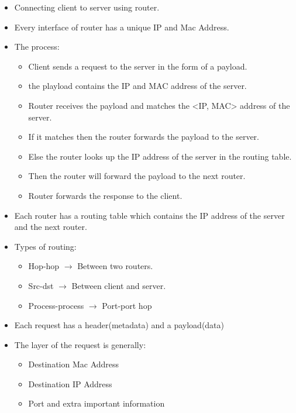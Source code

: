 \documentclass[a4paper, twoside]{report}
\author{Dev M.}
\date{07/08/2023}
\begin{document}


\begin{itemize}
    \item Connecting client to server using router.
    \item Every interface of router has a unique IP and Mac Address.
    \item The process: 
        \begin{itemize}
            \item Client sends a request to the server in the form of a payload.
            \item the playload contains the IP and MAC address of the server. 
            \item Router receives the payload and matches the <IP, MAC> address of the server.
            \item If it matches then the router forwards the payload to the server.
            \item Else the router looks up the IP address of the server in the routing table.
            \item Then the router will forward the payload to the next router.
            \item Router forwards the response to the client.
        \end{itemize}
    \item Each router has a routing table which contains the IP address of the server and the next router.
    \item Types of routing:
        \begin{itemize}
            \item Hop-hop $\rightarrow$ Between two routers.
            \item Src-dst $\rightarrow$ Between client and server.
            \item Process-process $\rightarrow$ Port-port hop
        \end{itemize}
    \item Each request has a header(metadata) and a payload(data)
    \item The layer of the request is generally: \begin{itemize}
        \item Destination Mac Address
        \item Destination IP Address
        \item Port and extra important information
    \end{itemize}
\end{itemize}
\end{document}

